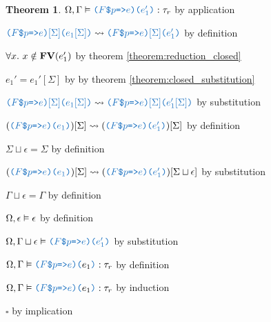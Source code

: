\documentclass[acmsmall]{acmart}
\theoremstyle{definition}
\newtheorem{theorem}{Theorem}[section]
\begin{document}
\begin{theorem}
      \item \Z\Z $\Omega, \Gamma \satisfies \obj{($F$\$$p$=>$e$)($e_1'$)} \hastype \tau_r$ by application
      \item \Z\Z $\obj{($F$\$$p$=>$e$)$[\Sigma]$($e_1[\Sigma]$)} \rightsquigarrow \obj{($F$\$$p$=>$e$)$[\Sigma]$($e_1'$)}$ by definition 
      \item \Z\Z $\forall x .\ x \notin \textbf{FV}(e_1')$ by theorem \ref{theorem:reduction_closed} 
      \item \Z\Z $e_1' = e_1'[\Sigma]$ by by theorem \ref{theorem:closed_substitution} 
      \item \Z\Z $\obj{($F$\$$p$=>$e$)$[\Sigma]$($e_1[\Sigma]$)} \rightsquigarrow \obj{($F$\$$p$=>$e$)$[\Sigma]$($e_1'[\Sigma]$)}$ by substitution 
      \item \Z\Z $(\obj{($F$\$$p$=>$e$)($e_1$)})[\Sigma] \rightsquigarrow (\obj{($F$\$$p$=>$e$)($e_1'$)})[\Sigma]$ by definition 
      \item \Z\Z $\Sigma \sqcup \epsilon = \Sigma$ by definition 
      \item \Z\Z $(\obj{($F$\$$p$=>$e$)($e_1$)})[\Sigma] \rightsquigarrow (\obj{($F$\$$p$=>$e$)($e_1'$)})[\Sigma \sqcup \epsilon]$ by substitution 
      \item \Z\Z $\Gamma \sqcup \epsilon = \Gamma$ by definition
      \item \Z\Z $\Omega, \epsilon \vDash \epsilon$ by definition
      \item \Z\Z $\Omega, \Gamma \sqcup \epsilon \satisfies \obj{($F$\$$p$=>$e$)($e_1'$)}$ by substitution 
      \item \Z\Z $\Omega, \Gamma \satisfies \obj{($F$\$$p$=>$e$)}\obj{(}e_1\obj{)} \hastype \tau_r$ by definition
    \item \Z $\Omega, \Gamma \satisfies \obj{($F$\$$p$=>$e$)}\obj{(}e_1\obj{)} \hastype \tau_r$ by induction
  \item $\square$ by implication 
\end{theorem}
\end{document}
